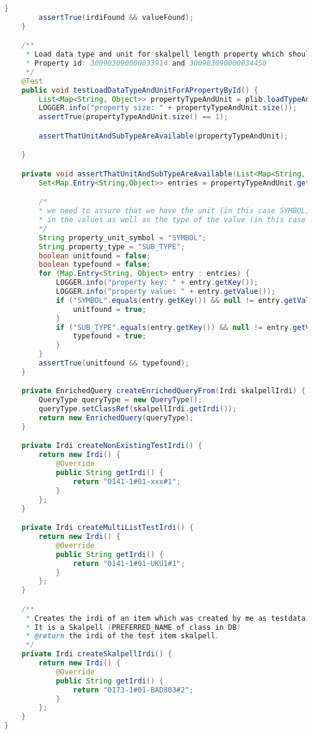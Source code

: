 \begin{lstlisting}[caption=Beispiel eines Integrationstests, language=Java, label=lst:integrationstest_beispiel]
        }
        assertTrue(irdiFound && valueFound);
    }

    /**
     * Load data type and unit for skalpell length property which should be mm and mm as well.
     * Property id: 300903090000033914 and 300903090000034450
     */
    @Test
    public void testLoadDataTypeAndUnitForAPropertyById() {
        List<Map<String, Object>> propertyTypeAndUnit = plib.loadTypeAndUnitOfPropertyBy("300903090000033914");
        LOGGER.info("property size: " + propertyTypeAndUnit.size());
        assertTrue(propertyTypeAndUnit.size() == 1);

        assertThatUnitAndSubTypeAreAvailable(propertyTypeAndUnit);

    }

    private void assertThatUnitAndSubTypeAreAvailable(List<Map<String, Object>> propertyTypeAndUnit) {
        Set<Map.Entry<String,Object>> entries = propertyTypeAndUnit.get(0).entrySet();

        /*
        * we need to assure that we have the unit (in this case SYMBOL, e.g. mm or m or cm)
        * in the values as well as the type of the value (in this case real_measure_type)
        */
        String property_unit_symbol = "SYMBOL";
        String property_type = "SUB_TYPE";
        boolean unitfound = false;
        boolean typefound = false;
        for (Map.Entry<String, Object> entry : entries) {
            LOGGER.info("property key: " + entry.getKey());
            LOGGER.info("property value: " + entry.getValue());
            if ("SYMBOL".equals(entry.getKey()) && null != entry.getValue() && !"null".equals(entry.getValue())) {
                unitfound = true;
            }
            if ("SUB_TYPE".equals(entry.getKey()) && null != entry.getValue() && !"null".equals(entry.getValue())) {
                typefound = true;
            }
        }
        assertTrue(unitfound && typefound);
    }

    private EnrichedQuery createEnrichedQueryFrom(Irdi skalpellIrdi) {
        QueryType queryType = new QueryType();
        queryType.setClassRef(skalpellIrdi.getIrdi());
        return new EnrichedQuery(queryType);
    }

    private Irdi createNonExistingTestIrdi() {
        return new Irdi() {
            @Override
            public String getIrdi() {
                return "0141-1#01-xxx#1";
            }
        };
    }

    private Irdi createMultiListTestIrdi() {
        return new Irdi() {
            @Override
            public String getIrdi() {
                return "0141-1#01-UKU1#1";
            }
        };
    }

    /**
     * Creates the irdi of an item which was created by me as testdata.
     * It is a Skalpell (PREFERRED_NAME of class in DB)
     * @return the irdi of the test item skalpell.
     */
    private Irdi createSkalpellIrdi() {
        return new Irdi() {
            @Override
            public String getIrdi() {
                return "0173-1#01-BAD803#2";
            }
        };
    }
}

\end{lstlisting}  
   